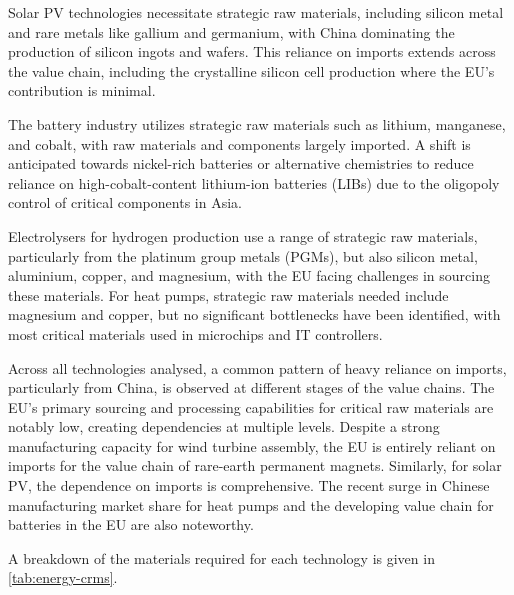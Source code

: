 Solar PV technologies necessitate strategic raw materials, including silicon metal and rare metals like gallium and germanium, with China dominating the production of silicon ingots and wafers. This reliance on imports extends across the value chain, including the crystalline silicon cell production where the EU's contribution is minimal.

The battery industry utilizes strategic raw materials such as lithium, manganese, and cobalt, with raw materials and components largely imported. A shift is anticipated towards nickel-rich batteries or alternative chemistries to reduce reliance on high-cobalt-content lithium-ion batteries (LIBs) due to the oligopoly control of critical components in Asia.

Electrolysers for hydrogen production use a range of strategic raw materials, particularly from the platinum group metals (PGMs), but also silicon metal, aluminium, copper, and magnesium, with the EU facing challenges in sourcing these materials. For heat pumps, strategic raw materials needed include magnesium and copper, but no significant bottlenecks have been identified, with most critical materials used in microchips and IT controllers.

Across all technologies analysed, a common pattern of heavy reliance on imports, particularly from China, is observed at different stages of the value chains. The EU’s primary sourcing and processing capabilities for critical raw materials are notably low, creating dependencies at multiple levels. Despite a strong manufacturing capacity for wind turbine assembly, the EU is entirely reliant on imports for the value chain of rare-earth permanent magnets. Similarly, for solar PV, the dependence on imports is comprehensive. The recent surge in Chinese manufacturing market share for heat pumps and the developing value chain for batteries in the EU are also noteworthy.

A breakdown of the materials required for each technology is given in \autoref{tab:energy-crms}.


